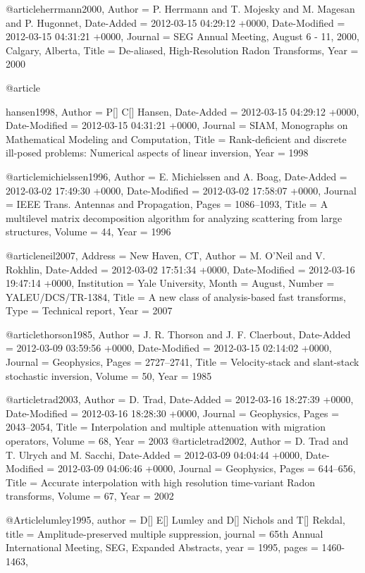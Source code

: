 @article{herrmann2000,
	Author = {P. Herrmann and T. Mojesky and M. Magesan and P. Hugonnet},
	Date-Added = {2012-03-15 04:29:12 +0000},
	Date-Modified = {2012-03-15 04:31:21 +0000},
	Journal = {SEG Annual Meeting, August 6 - 11, 2000, Calgary, Alberta},
	Title = {De-aliased, High-Resolution {R}adon Transforms},
	Year = {2000}}

@article{hansen1998,
	Author = {P[] C[] Hansen,
	Date-Added = {2012-03-15 04:29:12 +0000},
	Date-Modified = {2012-03-15 04:31:21 +0000},
	Journal = {SIAM, Monographs on Mathematical Modeling and Computation},
	Title = {Rank-deficient and discrete ill-posed problems: Numerical aspects of linear inversion},
	Year = {1998}}

@article{michielssen1996,
	Author = {E. Michielssen and A. Boag},
	Date-Added = {2012-03-02 17:49:30 +0000},
	Date-Modified = {2012-03-02 17:58:07 +0000},
	Journal = {IEEE Trans. Antennas and Propagation},
	Pages = {1086--1093},
	Title = {A multilevel matrix decomposition algorithm for analyzing scattering from large structures},
	Volume = {44},
	Year = {1996}}

@article{neil2007,
	Address = {New Haven, CT},
	Author = {M. O'Neil and V. Rokhlin},
	Date-Added = {2012-03-02 17:51:34 +0000},
	Date-Modified = {2012-03-16 19:47:14 +0000},
	Institution = {Yale University},
	Month = {August},
	Number = {YALEU/DCS/TR-1384},
	Title = {A new class of analysis-based fast transforms},
	Type = {Technical report},
	Year = {2007}}

@article{thorson1985,
	Author = {J. R. Thorson and J. F. Claerbout},
	Date-Added = {2012-03-09 03:59:56 +0000},
	Date-Modified = {2012-03-15 02:14:02 +0000},
	Journal = {Geophysics},
	Pages = {2727--2741},
	Title = {Velocity-stack and slant-stack stochastic inversion},
	Volume = {50},
	Year = {1985}}

@article{trad2003,
	Author = {D. Trad},
	Date-Added = {2012-03-16 18:27:39 +0000},
	Date-Modified = {2012-03-16 18:28:30 +0000},
	Journal = {Geophysics},
	Pages = {2043--2054},
	Title = {Interpolation and multiple attenuation with migration operators},
	Volume = {68},
	Year = {2003}}
@article{trad2002,
	Author = {D. Trad and T. Ulrych and M. Sacchi},
	Date-Added = {2012-03-09 04:04:44 +0000},
	Date-Modified = {2012-03-09 04:06:46 +0000},
	Journal = {Geophysics},
	Pages = {644--656},
	Title = {Accurate interpolation with high resolution time-variant {R}adon transforms},
	Volume = {67},
	Year = {2002}}

@Article{lumley1995,
  author = 	 {D[] E[] Lumley and D[] Nichols and T[] Rekdal},
  title = 	 {Amplitude-preserved multiple suppression},
  journal = 	 {65th Annual International Meeting, SEG, Expanded Abstracts},
  year = 	 1995,
  pages =	 {1460-1463},
}

}
